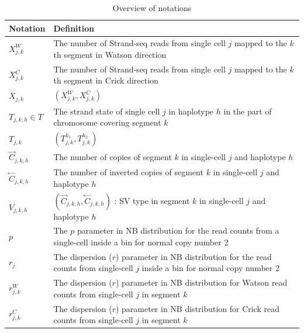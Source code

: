 \documentclass[12pt]{article}
\renewcommand{\j}{j} %
\newcommand{\CN}{C} %
\newcommand{\X}{X} %
\renewcommand{\k}{k} %
\newcommand{\h}{h} %
\newcommand{\T}{T} %
\newcommand{\V}{V} %
\begin{document}
\begin{table}[tb]
	\caption{Overview of notations}
	\centering
	\begin{tabular}{  p{4cm} p{12.5cm} }
		\hline
		Notation & Definition\\
		\hline
		$\X_{\j,\k}^W$ & The number of Strand-seq reads from single cell $\j$ mapped to the $\k$th segment in Watson direction\\

		$\X_{\j,\k}^C$ & The number of Strand-seq reads from single cell $\j$ mapped to the $\k$th segment in Crick direction\\
		
		$\X_{\j,\k}$ & $(\X_{\j,\k}^W, \X_{\j,\k}^C)$\\
		
		$\T_{\j, \k, \h} \in \T$ & The strand state of single cell $\j$ in haplotype $\h$ in the part of chromosome covering segment $\k$\\
		
		$\T_{\j,\k}$ & $(\T_{\j, \k}^{\h_1}, \T_{\j, \k}^{\h_2})$\\
		
		$\stackrel{\rightarrow}{\CN}_{\j,\k,\h}$ & The number of copies of segment $\k$ in single-cell $\j$ and haplotype $\h$ \\
		
		$\stackrel{\leftarrow}{\CN}_{\j,\k,\h}$ & The number of inverted copies of segment $\k$ in single-cell $\j$ and haplotype $\h$ \\
		
		$\V_{\j, \k, \h}$ &$(\stackrel{\rightarrow}{\CN}_{\j,\k,\h}, \stackrel{\leftarrow}{\CN}_{\j,\k,\h})$ : SV type in segment $\k$ in single-cell $\j$ and haplotype $\h$\\
		
		$p$ & The $p$ parameter in NB distribution for the read counts from a single-cell inside a bin for normal copy number 2\\
		
		$r_\j$ & The dispersion ($r$) parameter in NB distribution for the read counts from single-cell $\j$ inside a bin for normal copy number 2\\
		
		$r_{\j,\k}^W$ & The dispersion ($r$) parameter in NB distribution for Watson read counts from single-cell $\j$ in segment $\k$\\
		
		$r_{\j,\k}^C$ & The dispersion ($r$) parameter in NB distribution for Crick read counts from single-cell $\j$ in segment $\k$\\
		

\end{tabular}
\end{table}
\end{document}

